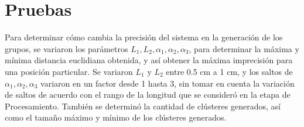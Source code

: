 \section{Pruebas}

Para determinar cómo cambia la precisión del sistema en la generación de los grupos, se variaron los parámetros $L_1, L_2, \alpha_1, \alpha_2, \alpha_3$, para determinar la máxima y mínima distancia euclidiana obtenida, y así obtener la máxima imprecisión para una posición particular. Se variaron $L_1$ y $L_2$ entre 0.5 cm a 1 cm, y los saltos de $\alpha_1, \alpha_2, \alpha_3$ variaron en un factor desde 1 hasta 3, sin tomar en cuenta la variación de saltos de acuerdo con el rango de la longitud que se consideró en la etapa de Procesamiento. También se determinó la cantidad de clústeres generados, así como el tamaño máximo y mínimo de los clústeres generados.